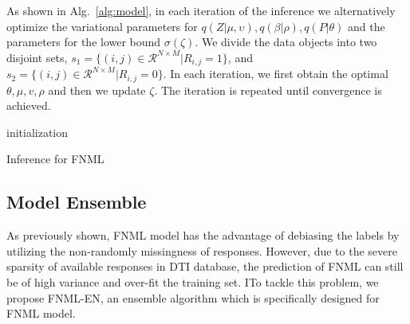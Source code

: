 \documentclass[conference]{IEEEtran}
\begin{document}
As shown in Alg.~\ref{alg:model}, in each iteration of the inference we alternatively optimize the variational parameters for $q(Z|\mu,\upsilon),q(\beta|\rho), q(P|\theta)$ and the parameters for the lower bound $\sigma(\zeta)$. We divide the data objects into two disjoint sets, $s_1 = \{(i,j)\in \mathcal{R}^{N\times M}|R_{i,j}=1\}$, and $s_2= \{(i,j)\in \mathcal{R}^{N\times M}|R_{i,j}=0\}$. In each iteration, we first obtain the optimal $\theta,\mu,v,\rho$ and then we update $\zeta$. The iteration is repeated until convergence is achieved.

\begin{algorithm}
    \Output{$\mu$, $\upsilon$, $\rho$, $\theta$, $\zeta$}
    initialization\;
    \caption{Inference for FNML}\label{alg:model}
\end{algorithm}

\subsection{Model Ensemble}
As previously shown, FNML model has the advantage of debiasing the labels by utilizing the non-randomly missingness of responses. However, due to the severe sparsity of available responses in DTI database, the prediction of FNML can still be of high variance and over-fit the training set. ITo tackle this problem, we propose FNML-EN, an ensemble algorithm which is specifically designed for FNML model.
\end{document}
